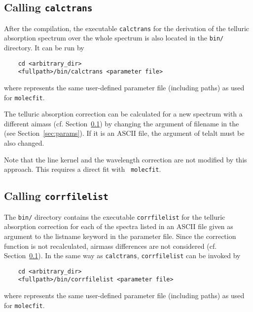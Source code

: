 \subsection{Calling {\tt calctrans}}\label{sec:callingct}
After the compilation, the executable {\tt calctrans} for the derivation of
the telluric absorption spectrum over the whole spectrum is also located in the {\tt bin/}
directory. It can be run by
\begin{verbatim}
    cd <arbitrary_dir>
    <fullpath>/bin/calctrans <parameter file>
\end{verbatim}
where {\tt <parameter file>} represents the same user-defined parameter file
(including paths) as used for {\tt molecfit}.

The  telluric  absorption  correction  can be  calculated  for  a  new
spectrum with a different aimass (cf.  Section~\ref{sec:callingct}) by
changing the argument of {\sc  filename} in the {\tt <parameter file>}
(see Section~\ref{sec:params}). If it is an ASCII file, the argument 
of {\sc telalt} must be also changed.

Note  that the  line  kernel  and the  wavelength  correction are  not
modified  by this  approach.  This  requires a  direct  fit with  {\tt
  molecfit}.


\subsection{Calling {\tt corrfilelist}}\label{sec:callingcfl}
The {\tt bin/} directory contains the executable {\tt corrfilelist}
for the telluric absorption correction for each of the spectra listed in
an ASCII file given as argument to the {\sc listname} keyword 
in the parameter file. Since the
correction function is not recalculated, airmass differences are not
considered (cf. Section~\ref{sec:callingct}). In the same way as
{\tt calctrans}, {\tt corrfilelist} can be invoked by
\begin{verbatim}
    cd <arbitrary_dir>
    <fullpath>/bin/corrfilelist <parameter file>
\end{verbatim}
where {\tt <parameter file>} represents the same user-defined parameter file
(including paths) as used for {\tt molecfit}.


